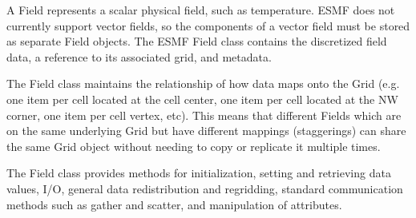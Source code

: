 
A Field represents a scalar physical field, such as temperature.  
ESMF does not currently support vector fields, so the components of 
a vector field must be stored as separate Field objects.  The 
ESMF Field class contains the discretized field data, a reference 
to its associated grid, and metadata.  

The Field class maintains the relationship of
how data maps onto the Grid (e.g. one item per cell located at
the cell center, one item per cell located at the NW corner, 
one item per cell vertex, etc).  This means that different Fields
which are on the same underlying Grid but have different
mappings (staggerings) can share the same Grid object without
needing to copy or replicate it multiple times. 

The Field class provides methods for initialization, setting and 
retrieving data values, I/O, general data redistribution and regridding, 
standard communication methods such as gather and scatter, and 
manipulation of attributes.



